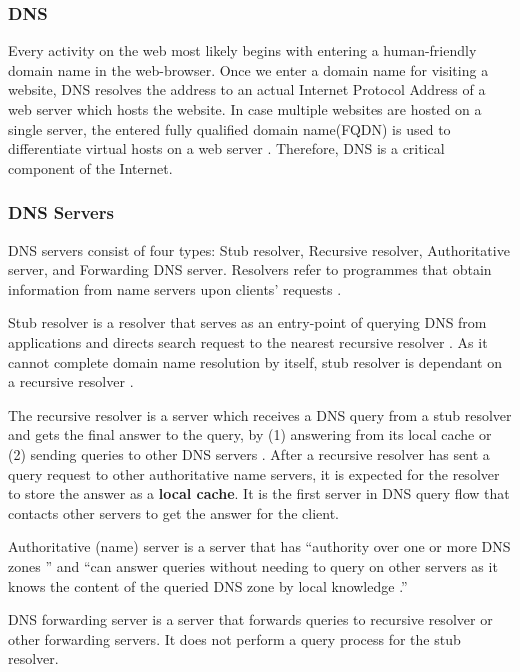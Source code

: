 \subsubsection{DNS}\label{dns-introduction}
Every activity on the web most likely begins with entering a human-friendly domain name in the web-browser. Once we enter a domain name for visiting a website, DNS resolves the address to an actual Internet Protocol Address of a web server which hosts the website. In case multiple websites are hosted on a single server, the entered fully qualified domain name(FQDN) is used to differentiate virtual hosts on a web server \cite{virtual24host}. Therefore, DNS is a critical component of the Internet.
\subsubsection{DNS Servers}\label{dnsservers}
DNS servers consist of four types: Stub resolver, Recursive resolver, Authoritative server, and Forwarding DNS server. Resolvers refer to programmes that obtain information from name servers upon clients' requests \cite{rfc1034}.

Stub resolver is a resolver that serves as an entry-point of querying DNS from applications and directs search request to the nearest recursive resolver \cite{rfc1123}. As it cannot complete domain name resolution by itself, stub resolver is dependant on a recursive resolver \cite{rfc8499}.

The recursive resolver is a server which receives a DNS query from a stub resolver and gets the final answer to the query, by (1) answering from its local cache or (2) sending queries to other DNS servers \cite{rfc8499}. After a recursive resolver has sent a query request to other authoritative name servers, it is expected for the resolver to store the answer as a \textbf{local cache}. It is the first server in DNS query flow that contacts other servers to get the answer for the client. 

Authoritative (name) server is a server that has ``authority over one or more DNS zones \cite{rfc8499}'' and ``can answer queries without needing to query on other servers as it knows the content of the queried DNS zone by local knowledge \cite{rfc2182}.''

DNS forwarding server is a server that forwards queries to recursive resolver or other forwarding servers. It does not perform a query process for the stub resolver.
